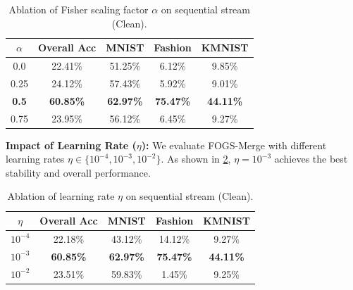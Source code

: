 \documentclass{article}
\theoremstyle{plain}
\theoremstyle{definition}
\theoremstyle{remark}
\begin{document}
\begin{table}[h]
\caption{Ablation of Fisher scaling factor $\alpha$ on sequential stream (Clean).}
\label{tab:ablation_alpha}
\vskip 0.1in
\begin{center}
\begin{small}
\begin{sc}
\setlength{\tabcolsep}{3pt}
\begin{tabular}{ccccc}
\toprule
$\alpha$ & Overall Acc & MNIST & Fashion & KMNIST \\
\midrule
0.0 & 22.41\% & 51.25\% & 6.12\% & 9.85\% \\
0.25 & 24.12\% & 57.43\% & 5.92\% & 9.01\% \\
\textbf{0.5} & \textbf{60.85\%} & \textbf{62.97\%} & \textbf{75.47\%} & \textbf{44.11\%} \\
0.75 & 23.95\% & 56.12\% & 6.45\% & 9.27\% \\
\bottomrule
\end{tabular}
\end{sc}
\end{small}
\end{center}
\vskip -0.1in
\end{table}

\textbf{Impact of Learning Rate ($\eta$):} We evaluate FOGS-Merge with different learning rates $\eta \in \{10^{-4}, 10^{-3}, 10^{-2}\}$. As shown in \cref{tab:ablation_lr}, $\eta = 10^{-3}$ achieves the best stability and overall performance.

\begin{table}[h]
\caption{Ablation of learning rate $\eta$ on sequential stream (Clean).}
\label{tab:ablation_lr}
\vskip 0.1in
\begin{center}
\begin{small}
\begin{sc}
\setlength{\tabcolsep}{3pt}
\begin{tabular}{ccccc}
\toprule
$\eta$ & Overall Acc & MNIST & Fashion & KMNIST \\
\midrule
$10^{-4}$ & 22.18\% & 43.12\% & 14.12\% & 9.27\% \\
\textbf{$10^{-3}$} & \textbf{60.85\%} & \textbf{62.97\%} & \textbf{75.47\%} & \textbf{44.11\%} \\
$10^{-2}$ & 23.51\% & 59.83\% & 1.45\% & 9.25\% \\
\bottomrule
\end{tabular}
\end{sc}
\end{small}
\end{center}
\vskip -0.1in
\end{table}
\end{document}
